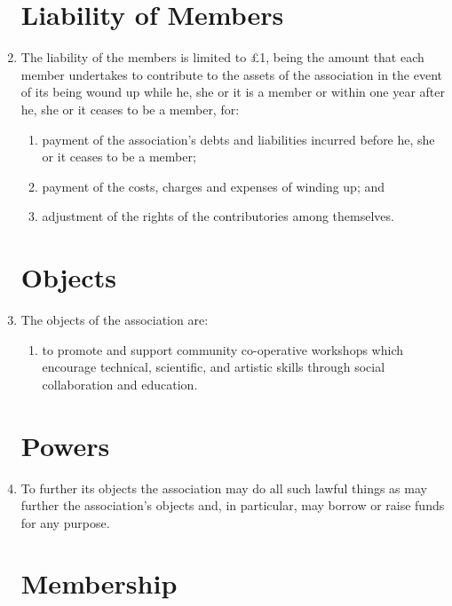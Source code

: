 \begin{enumerate}
\section{Liability of Members}

\item
  The liability of the members is limited to £1, being the amount that
  each member undertakes to contribute to the assets of the association
  in the event of its being wound up while he, she or it is a member or
  within one year after he, she or it ceases to be a member, for:
  \begin{enumerate}
  \item
    payment of the association's debts and liabilities incurred before he,
    she or it ceases to be a member;
  \item
    payment of the costs, charges and expenses of winding up; and
  \item
    adjustment of the rights of the contributories among themselves.
  \end{enumerate}

\section{Objects}

\item
  The objects of the association are:
  \begin{enumerate}
  \item
    to promote and support community co-operative workshops which encourage
    technical, scientific, and artistic skills through social collaboration and education.
  \end{enumerate}

\section{Powers}

\item To further its objects the association may do all such lawful things as may
      further the association's objects and, in particular, may borrow or raise
      funds for any purpose.

\section{Membership}


\end{enumerate}
